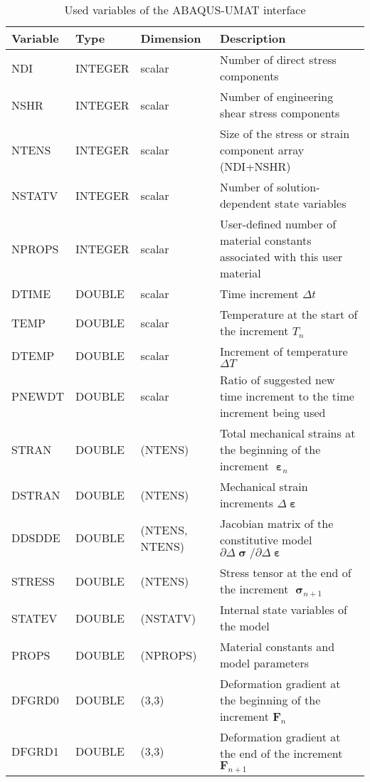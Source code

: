 \begin{table}[htbp]
  \centering
  \caption{Used variables of the ABAQUS-UMAT interface}
    \begin{tabular}{p{2cm}p{2cm}p{2cm}p{8cm}}
    \toprule
    Variable & Type  & Dimension & Description \\
    \midrule
    NDI   & INTEGER & scalar & Number of direct stress components \\
    NSHR  & INTEGER & scalar & Number of engineering shear stress components \\
    NTENS & INTEGER & scalar & Size of the stress or strain component array (NDI+NSHR) \\
    NSTATV & INTEGER & scalar & Number of solution-dependent state variables \\
    NPROPS & INTEGER & scalar & User-defined number of material constants associated with this user material \\
    DTIME & DOUBLE & scalar & Time increment $\Delta t$ \\
    TEMP  & DOUBLE & scalar & Temperature at the start of the increment $T_n$ \\
    DTEMP & DOUBLE & scalar & Increment of temperature $\Delta T$ \\
    PNEWDT & DOUBLE & scalar & Ratio of suggested new time increment to the time increment being used \\
    STRAN & DOUBLE & (NTENS) & Total mechanical strains at the beginning of the increment $\bm{\upepsilon}_n$ \\
    DSTRAN & DOUBLE & (NTENS) & Mechanical strain increments $\Delta \bm{\upepsilon}$ \\
    DDSDDE & DOUBLE & (NTENS, NTENS) & Jacobian matrix of the constitutive model $\partial\Delta {\bm{\upsigma }} /\partial\Delta {\bm{\upepsilon }}$ \\
    STRESS & DOUBLE & (NTENS) & Stress tensor at the end of the increment $\bm{\upsigma}_{n+1}$ \\
    STATEV & DOUBLE & (NSTATV) & Internal state variables of the model \\
    PROPS & DOUBLE & (NPROPS) & Material constants and model parameters \\
    DFGRD0 & DOUBLE & (3,3) & Deformation gradient at the beginning of the increment $\bm{F}_n$ \\
    DFGRD1 & DOUBLE & (3,3) & Deformation gradient at the end of the increment $\bm{F}_{n+1}$ \\
    \bottomrule
    \end{tabular}%
  \label{tab:ABAQUS-UMAT_interface}%
\end{table}%

